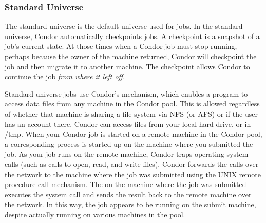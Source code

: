 \subsubsection{\label{sec:standard-universe}Standard Universe}

The standard universe is the default universe used for jobs.
In the standard universe, Condor automatically checkpoints jobs.
A checkpoint is a snapshot of a job's current state.
At those times when a Condor job must stop running,
perhaps because the owner of the machine returned, Condor
will checkpoint the job and then migrate it to another machine.
The checkpoint allows Condor to continue the job
\emph{from where it left off}. 

Standard universe jobs use Condor's 
mechanism, which enables a program to access data files from
any machine in the Condor pool.
This is allowed regardless of whether that machine is
sharing a file system via NFS (or AFS) or if the user has an account
there. 
Condor can access files from your local hard drive, or in /tmp. 
When your Condor
job is started on a remote machine in the Condor pool,
a corresponding 
process
is started up on the machine where you submitted the job.
As your job runs on the remote machine,
Condor traps operating system calls (such as calls to open, read, and
write files). 
Condor forwards the calls over the network to the machine where
the job was submitted using the UNIX remote procedure call mechanism.
The  on the machine where the job was
submitted executes the system
call and sends the result back to the remote machine over the network.
In this way, the job appears to be
running on the submit machine, despite actually
running on various machines in the pool.

